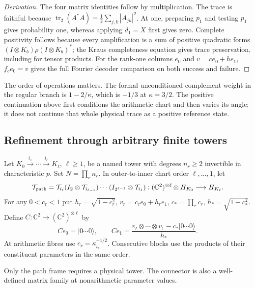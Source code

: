 \begin{proof}[Derivation]
The four matrix identities follow by multiplication. The trace is faithful
because $\operatorname{tr}_2(A^*A)=\frac12\sum_{j,k}|A_{jk}|^2$.
At one, preparing $p_1$ and testing $p_1$ gives probability one, whereas
applying $d_1=X$ first gives zero. Complete positivity follows because
every amplification is a sum of positive quadratic forms
$(I\otimes K_b)\rho(I\otimes K_b)^*$; the Kraus completeness equation
gives trace preservation, including for tensor products.
For the rank-one columns $e_0$ and $v=ce_0+he_1$, $f_ce_0=v$ gives
the full Fourier decoder comparison on both success and failure.
\end{proof}

The order of operations matters. The formal unconditioned complement
weight in the regular branch is $1-2/\kappa$, which is $-1/3$ at
$\kappa=3/2$. The positive continuation above first conditions the
arithmetic chart and then varies its angle; it does not continue that
whole physical trace as a positive reference state.

\subsection{Refinement through arbitrary finite towers}

\begin{definition}
Let $K_0\xrightarrow{i_1}\cdots\xrightarrow{i_\ell}K_\ell$, $\ell\geq1$,
be a named tower with degrees $n_r\geq2$ invertible in characteristic $p$.
Set $N=\prod_rn_r$. In outer-to-inner chart order $\ell,\ldots,1$, let
\[
 \mathcal T_{\rm path}=\mathcal T_{i_\ell}
 (I_2\otimes\mathcal T_{i_{\ell-1}})\cdots
 (I_{2^{\ell-1}}\otimes\mathcal T_{i_1})
 : (\mathbb C^2)^{\otimes\ell}\otimes H_{K_0}\longrightarrow H_{K_\ell}.
\]
For any $0<c_r<1$ put $h_r=\sqrt{1-c_r^2}$,
$v_r=c_re_0+h_re_1$, $c_*=\prod_rc_r$, $h_*=\sqrt{1-c_*^2}$.
Define $C:\mathbb C^2\to(\mathbb C^2)^{\otimes\ell}$ by
\[
 Ce_0=|0\cdots0\rangle,\qquad
 Ce_1=\frac{v_\ell\otimes\cdots\otimes v_1-c_*|0\cdots0\rangle}{h_*}.
\]
At arithmetic fibres use $c_r=\kappa_{i_r}^{-1/2}$. Consecutive blocks
use the products of their constituent parameters in the same order.
\end{definition}
\begin{scope}
Only the path frame requires a physical tower. The connector is also a
well-defined matrix family at nonarithmetic parameter values.
\end{scope}

